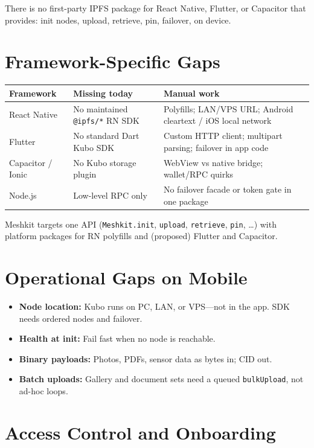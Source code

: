 \documentclass[11pt,a4paper,openany]{report}
\begin{document}
There is no first-party IPFS package for React Native, Flutter, or Capacitor that provides: init nodes, upload, retrieve, pin, failover, on device.

\section{Framework-Specific Gaps}

\begin{center}
\small
\begin{tabular}{@{}p{2.4cm}p{4.2cm}p{6.2cm}@{}}
\toprule
\textbf{Framework} & \textbf{Missing today} & \textbf{Manual work} \\
\midrule
React Native & No maintained \texttt{@ipfs/*} RN SDK & Polyfills; LAN/VPS URL; Android cleartext / iOS local network \\
Flutter & No standard Dart Kubo SDK & Custom HTTP client; multipart parsing; failover in app code \\
Capacitor / Ionic & No Kubo storage plugin & WebView vs native bridge; wallet/RPC quirks \\
Node.js & Low-level RPC only & No failover facade or token gate in one package \\
\bottomrule
\end{tabular}
\end{center}

Meshkit targets one API (\texttt{Meshkit.init}, \texttt{upload}, \texttt{retrieve}, \texttt{pin}, \ldots) with platform packages for RN polyfills and (proposed) Flutter and Capacitor.

\section{Operational Gaps on Mobile}

\begin{itemize}[leftmargin=*]
  \item \textbf{Node location:} Kubo runs on PC, LAN, or VPS—not in the app. SDK needs ordered nodes and failover.
  \item \textbf{Health at init:} Fail fast when no node is reachable.
  \item \textbf{Binary payloads:} Photos, PDFs, sensor data as bytes in; CID out.
  \item \textbf{Batch uploads:} Gallery and document sets need a queued \texttt{bulkUpload}, not ad-hoc loops.
\end{itemize}

\section{Access Control and Onboarding}
\end{document}
